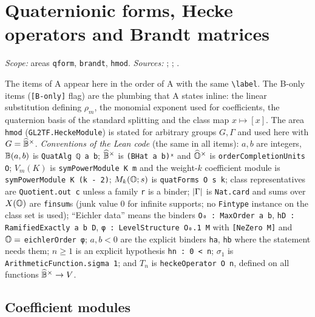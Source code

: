 \chapter{Quaternionic forms, Hecke operators and Brandt matrices}\label{ch:ch-iii-08-brandt}

\noindent\emph{Scope:} areas \texttt{qform}, \texttt{brandt}, \texttt{hmod}. \emph{Sources:} \cite[§§1--2, pp.~169--173]{Shz};
\cite[Def.~2.13, p.~353; Lemma~2.18, p.~356; Prop.~2.22, p.~358]{Piz}; \cite[Ch.~41]{Voi}.

\noindent The items of A appear here in the order of A with the same \texttt{\textbackslash label}. The B-only items (\texttt{[B-only]} flag) are the plumbing that A states inline: the linear substitution
defining $\rho_m$, the monomial exponent used for coefficients, the quaternion basis of the standard splitting and the class map $x\mapsto[x]$. The area \texttt{hmod} (\texttt{GL2TF.HeckeModule}) is stated for
arbitrary groups $G,\Gamma$ and used here with $G=\widehat{\mathbb{B}}^\times$. \emph{Conventions of the Lean code} (the same in all items): $a,b$ are integers, $\mathbb{B}(a,b)$ is \texttt{QuatAlg ℚ a b}; $\widehat{\mathbb{B}}^\times$ is \texttt{(BHat a b)ˣ}
and $\widehat{\mathbb{O}}^\times$ is \texttt{orderCompletionUnits O}; $V_m(K)$ is \texttt{symPowerModule K m} and the weight-$k$ coefficient module is \texttt{symPowerModule K (k - 2)}; $M_k(\mathbb{O};s)$ is \texttt{quatForms O s k};
class representatives are \texttt{Quotient.out c} unless a family \texttt{r} is a binder; $\lvert\Gamma\rvert$ is \texttt{Nat.card} and sums over $X(\mathbb{O})$ are \texttt{finsum}s (junk value $0$ for infinite supports; no \texttt{Fintype}
instance on the class set is used); ``Eichler data'' means the binders \texttt{O₀ : MaxOrder a b}, \texttt{hD : RamifiedExactly a b D}, \texttt{φ : LevelStructure O₀.1 M} with \texttt{[NeZero M]} and $\mathbb{O}=$ \texttt{eichlerOrder φ};
$a,b<0$ are the explicit binders \texttt{ha}, \texttt{hb} where the statement needs them; $n\ge1$ is an explicit hypothesis \texttt{hn : 0 < n}; $\sigma_1$ is \texttt{ArithmeticFunction.sigma 1}; and $T_n$ is
\texttt{heckeOperator O n}, defined on all functions $\widehat{\mathbb{B}}^\times\to V$.

\section{Coefficient modules}\label{sec:qform-coefficients}

